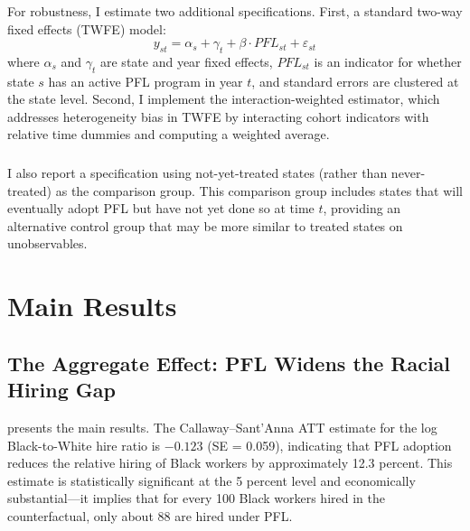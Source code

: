 \documentclass[12pt]{article}
\begin{document}
\subsubsection*{}
For robustness, I estimate two additional specifications. First, a standard two-way fixed effects (TWFE) model:
\begin{equation}
    y_{st} = \alpha_s + \gamma_t + \beta \cdot PFL_{st} + \varepsilon_{st}
\end{equation}
where $\alpha_s$ and $\gamma_t$ are state and year fixed effects, $PFL_{st}$ is an indicator for whether state $s$ has an active PFL program in year $t$, and standard errors are clustered at the state level. Second, I implement the \citet{sun2021} interaction-weighted estimator, which addresses heterogeneity bias in TWFE by interacting cohort indicators with relative time dummies and computing a weighted average.

\subsubsection*{}
I also report a specification using not-yet-treated states (rather than never-treated) as the comparison group. This comparison group includes states that will eventually adopt PFL but have not yet done so at time $t$, providing an alternative control group that may be more similar to treated states on unobservables.


\section{Main Results}

\subsection{The Aggregate Effect: PFL Widens the Racial Hiring Gap}

 presents the main results. The Callaway--Sant'Anna ATT estimate for the log Black-to-White hire ratio is $-0.123$ (SE = 0.059), indicating that PFL adoption reduces the relative hiring of Black workers by approximately 12.3 percent. This estimate is statistically significant at the 5 percent level and economically substantial---it implies that for every 100 Black workers hired in the counterfactual, only about 88 are hired under PFL.
\end{document}
